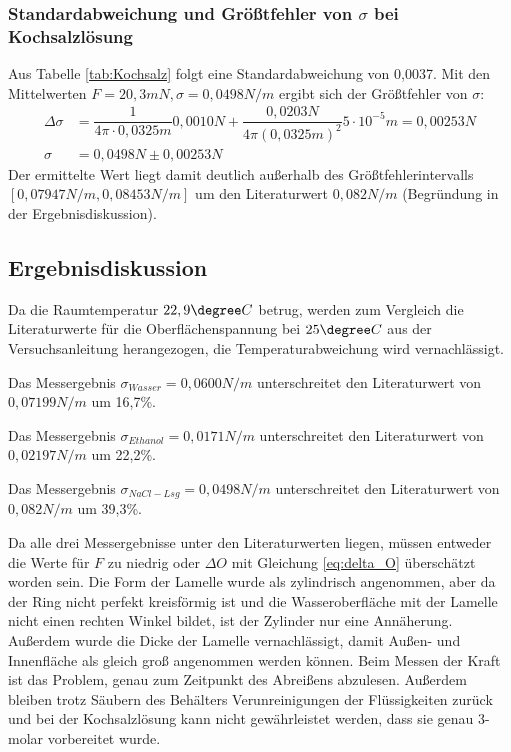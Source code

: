\documentclass{scrartcl}
\begin{document}
\subsubsection{Standardabweichung und Größtfehler von $\sigma$ bei Kochsalzlösung}
Aus Tabelle \ref{tab:Kochsalz} folgt eine Standardabweichung von 0,0037. Mit den Mittelwerten $F = 20,3mN, \sigma = 0,0498N/m$ ergibt sich der Größtfehler von $\sigma$:
\begin{align*}
\Delta \sigma & = \dfrac{1}{4 \pi \cdot 0,0325m} 0,0010N + \dfrac{0,0203N}{4 \pi (0,0325m)^2} 5 \cdot 10^{-5}m = 0,00253N \\
\sigma & = 0,0498N \pm 0,00253N
\end{align*}
Der ermittelte Wert liegt damit deutlich außerhalb des Größtfehlerintervalls \\$[0,07947N/m, 0,08453N/m]$ um den Literaturwert $0,082N/m$ (Begründung in der Ergebnisdiskussion).
\subsection{Ergebnisdiskussion}
Da die Raumtemperatur $22,9 \degree C$ betrug, werden zum Vergleich die Literaturwerte für die Oberflächenspannung bei $25 \degree C$ aus der Versuchsanleitung herangezogen, die Temperaturabweichung wird vernachlässigt.

Das Messergebnis $\sigma_{Wasser} = 0,0600N/m$ unterschreitet den Literaturwert von \\$0,07199N/m$ um 16,7\%.

Das Messergebnis $\sigma_{Ethanol} = 0,0171N/m$ unterschreitet den Literaturwert von \\$0,02197N/m$ um 22,2\%.

Das Messergebnis $\sigma_{NaCl-Lsg} = 0,0498N/m$ unterschreitet den Literaturwert von \\$0,082N/m$ um 39,3\%.

Da alle drei Messergebnisse unter den Literaturwerten liegen, müssen entweder die Werte für $F$ zu niedrig oder $\Delta O$ mit Gleichung \ref{eq:delta_O} überschätzt worden sein. Die Form der Lamelle wurde als zylindrisch angenommen, aber da der Ring nicht perfekt kreisförmig ist und die Wasseroberfläche mit der Lamelle nicht einen rechten Winkel bildet, ist der Zylinder nur eine Annäherung. Außerdem wurde die Dicke der Lamelle vernachlässigt, damit Außen- und Innenfläche als gleich groß angenommen werden können.
Beim Messen der Kraft ist das Problem, genau zum Zeitpunkt des Abreißens abzulesen.
Außerdem bleiben trotz Säubern des Behälters Verunreinigungen der Flüssigkeiten zurück und bei der Kochsalzlösung kann nicht gewährleistet werden, dass sie genau 3-molar vorbereitet wurde.
\newpage
\end{document}
